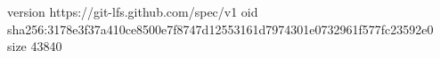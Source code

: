 version https://git-lfs.github.com/spec/v1
oid sha256:3178e3f37a410ce8500e7f8747d12553161d7974301e0732961f577fc23592e0
size 43840
